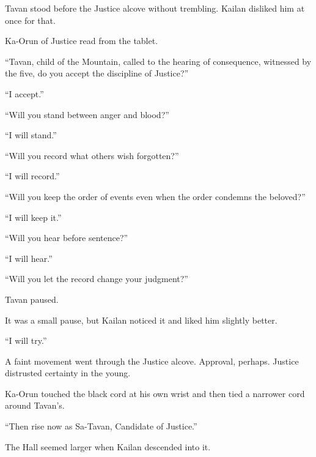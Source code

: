 Tavan stood before the Justice alcove without trembling. Kailan disliked him at once for that.\par

Ka-Orun of Justice read from the tablet.\par

“Tavan, child of the Mountain, called to the hearing of consequence, witnessed by the five, do you accept the discipline of Justice?”\par

“I accept.”\par

“Will you stand between anger and blood?”\par

“I will stand.”\par

“Will you record what others wish forgotten?”\par

“I will record.”\par

“Will you keep the order of events even when the order condemns the beloved?”\par

“I will keep it.”\par

“Will you hear before sentence?”\par

“I will hear.”\par

“Will you let the record change your judgment?”\par

Tavan paused.\par

It was a small pause, but Kailan noticed it and liked him slightly better.\par

“I will try.”\par

A faint movement went through the Justice alcove. Approval, perhaps. Justice distrusted certainty in the young.\par

Ka-Orun touched the black cord at his own wrist and then tied a narrower cord around Tavan’s.\par

“Then rise now as Sa-Tavan, Candidate of Justice.”\par

The Hall seemed larger when Kailan descended into it.\par

